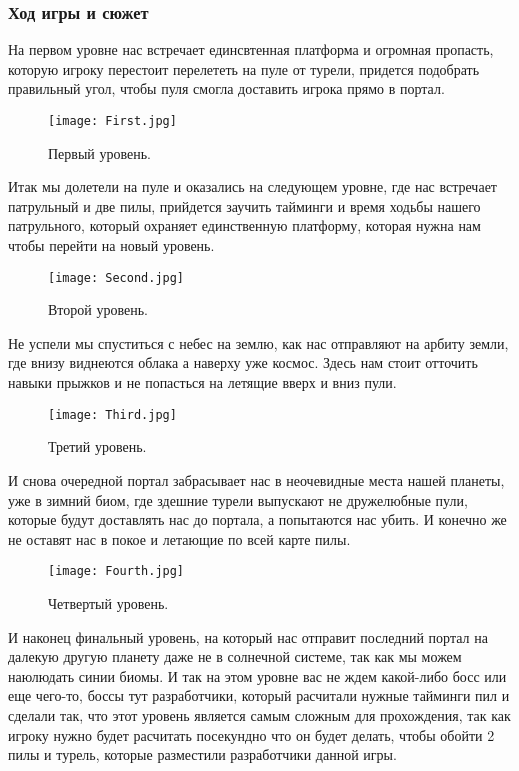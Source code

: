 \documentclass[a4paper,12pt]{article}
\begin{document}
\subsubsection{Ход игры и сюжет}
На первом уровне нас встречает единсвтенная платформа и огромная пропасть, которую игроку перестоит перелететь на пуле от турели, придется подобрать правильный угол, чтобы пуля смогла доставить игрока прямо в портал.

\begin{figure}[H] 
    \centering
    \texttt{[image: First.jpg]} 
    \caption{Первый уровень.}
    \label{fig:player_character}
\end{figure}

Итак мы долетели на пуле и оказались на следующем уровне, где нас встречает патрульный и две пилы, прийдется заучить тайминги и время ходьбы нашего патрульного, который охраняет единственную платформу, которая нужна нам чтобы перейти на новый уровень.

\begin{figure}[H] 
    \centering
    \texttt{[image: Second.jpg]} 
    \caption{Второй уровень.}
    \label{fig:player_character}
\end{figure}

Не успели мы спуститься с небес на землю, как нас отправляют на арбиту земли, где внизу виднеются облака а наверху уже космос. Здесь нам стоит отточить навыки прыжков и не попасться на летящие вверх и вниз пули.

\begin{figure}[H] 
    \centering
    \texttt{[image: Third.jpg]} 
    \caption{Третий уровень.}
    \label{fig:player_character}
\end{figure}

И снова очередной портал забрасывает нас в неочевидные места нашей планеты, уже в зимний биом, где здешние турели выпускают не дружелюбные пули, которые будут доставлять нас до портала, а попытаются нас убить. И конечно же не оставят нас в покое и летающие по всей карте пилы. 

\begin{figure}[H] 
    \centering
    \texttt{[image: Fourth.jpg]} 
    \caption{Четвертый уровень.}
    \label{fig:player_character}
\end{figure}

И наконец финальный уровень, на который нас отправит последний портал на далекую другую планету даже не в солнечной системе, так как мы можем наюлюдать синии биомы. И так на этом уровне вас не ждем какой-либо босс или еще чего-то, боссы тут разработчики, который расчитали нужные тайминги пил и сделали так, что этот уровень является самым сложным для прохождения, так как игроку нужно будет расчитать посекундно что он будет делать, чтобы обойти 2 пилы и турель, которые разместили разработчики данной игры.
\end{document}
